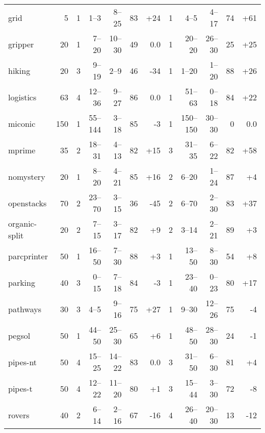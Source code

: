 \documentclass{article}
\begin{document}
\begin{table}
\begin{tabular}{l@{}rr|rrrr|r|rrrr}
         grid &     5 &   1 &    1--3 &  8--25 & 83 & {\color{blue}+24} &   1 &     4--5 &  4--17 & 74 & {\color{blue}+61} \\
      gripper &    20 &   1 &   7--20 & 10--30 & 49 &               0.0 &   1 &   20--20 & 26--30 & 25 & {\color{blue}+25} \\
       hiking &    20 &   3 &   9--19 &   2--9 & 46 &  {\color{red}-34} &   1 &    1--20 &  1--20 & 88 & {\color{blue}+26} \\
    logistics &    63 &   4 &  12--36 &  9--27 & 86 &               0.0 &   1 &   51--63 &  0--18 & 84 & {\color{blue}+22} \\
      miconic &   150 &   1 & 55--144 &  3--18 & 85 &   {\color{red}-3} &   1 & 150--150 & 30--30 &  0 &               0.0 \\
       mprime &    35 &   2 &  18--31 &  4--13 & 82 & {\color{blue}+15} &   3 &   31--35 &  6--22 & 82 & {\color{blue}+58} \\
    nomystery &    20 &   1 &   8--20 &  4--21 & 85 & {\color{blue}+16} &   2 &    6--20 &  1--24 & 87 &  {\color{blue}+4} \\
   openstacks &    70 &   2 &  23--70 &  3--15 & 36 &  {\color{red}-45} &   2 &    6--70 &  2--30 & 83 & {\color{blue}+37} \\
organic-split &    20 &   2 &   7--15 &  3--17 & 82 &  {\color{blue}+9} &   2 &    3--14 &  2--21 & 89 &  {\color{blue}+3} \\
  parcprinter &    50 &   1 &  16--50 &  7--30 & 88 &  {\color{blue}+3} &   1 &   13--50 &  8--30 & 54 &  {\color{blue}+8} \\
      parking &    40 &   3 &   0--15 &  7--18 & 84 &   {\color{red}-3} &   1 &   23--40 &  0--23 & 80 & {\color{blue}+17} \\
     pathways &    30 &   3 &    4--5 &  9--16 & 75 & {\color{blue}+27} &   1 &    9--30 & 12--26 & 75 &   {\color{red}-4} \\
       pegsol &    50 &   1 &  44--50 & 25--30 & 65 &  {\color{blue}+6} &   1 &   48--50 & 28--30 & 24 &   {\color{red}-1} \\
     pipes-nt &    50 &   4 &  15--25 & 14--22 & 83 &               0.0 &   3 &   31--50 &  6--30 & 81 &  {\color{blue}+4} \\
      pipes-t &    50 &   4 &  12--22 & 11--20 & 80 &  {\color{blue}+1} &   3 &   15--44 &  3--30 & 72 &   {\color{red}-8} \\
       rovers &    40 &   2 &   6--14 &  2--16 & 67 &  {\color{red}-16} &   4 &   26--40 & 20--30 & 13 &  {\color{red}-12} \\

\end{tabular}
\end{table}
\end{document}
